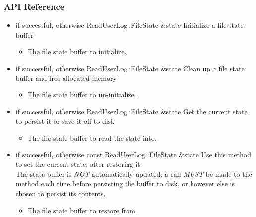 \subsubsection{API Reference}
\begin{itemize}

\item {}
  {} { if successful,  otherwise}
  {ReadUserLog::FileState \&state}
  {Initialize a file state buffer}
  \begin{itemize}
  \item {}
    The file state buffer to initialize.
  \end{itemize}

\item {}
  {} { if successful,  otherwise}
  {ReadUserLog::FileState \&state}
  {Clean up a file state buffer and free allocated memory}
  \begin{itemize}
  \item {}
    The file state buffer to un-initialize.
  \end{itemize}

\item {}
  {} { if successful,  otherwise}
  {ReadUserLog::FileState \&state}
  {Get the current state to persist it or save it off to disk}
  \begin{itemize}
  \item {}
    The file state buffer to read the state into.
  \end{itemize}

\item {}
  {} { if successful,  otherwise}
  {const ReadUserLog::FileState \&state}
  {Use this method to set the current state, after restoring it.
    \\ \Note The state buffer is \emph{NOT} automatically updated; a call 
    \emph{MUST} be made to
    the  method each time before persisting the
    buffer to disk, or however else is chosen to persist its contents.}
  \begin{itemize}
  \item {}
    The file state buffer to restore from.
  \end{itemize}

\end{itemize}

